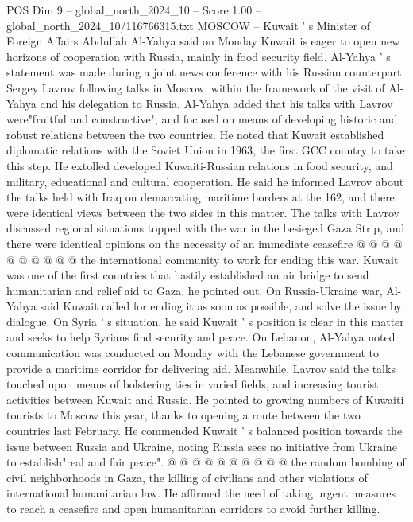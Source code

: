 \begin{textsample}{POS Dim 9 – global\_north\_2024\_10 – Score 1.00 – global\_north\_2024\_10/116766315.txt}  \label{ex:f9_pos_402}
MOSCOW -- Kuwait ' s Minister of Foreign Affairs Abdullah Al-Yahya said on Monday Kuwait is eager to open new horizons of cooperation with Russia, mainly in food security field.
Al-Yahya ' s statement was made during a joint news conference with his Russian counterpart Sergey Lavrov following talks in Moscow, within the framework of the visit of Al-Yahya and his delegation to Russia.
Al-Yahya added that his talks with Lavrov were"fruitful and constructive", and focused on means of developing historic and robust relations between the two countries.
He noted that Kuwait established diplomatic relations with the Soviet Union in 1963, the first GCC country to take this step.
He extolled developed Kuwaiti-Russian relations in food security, and military, educational and cultural cooperation.
He said he informed Lavrov about the talks held with Iraq on demarcating maritime borders at the 162, and there were identical views between the two sides in this matter.
The talks with Lavrov discussed regional situations topped with the war in the besieged Gaza Strip, and there were identical opinions on the necessity of an immediate ceasefire @ @ @ @ @ @ @ @ @ @ the international community to work for ending this war.
Kuwait was one of the first countries that hastily established an air bridge to send humanitarian and relief aid to Gaza, he pointed out.
On Russia-Ukraine war, Al-Yahya said Kuwait called for ending it as soon as possible, and solve the issue by dialogue.
On Syria ' s situation, he said Kuwait ' s position is clear in this matter and seeks to help Syrians find security and peace.
On Lebanon, Al-Yahya noted communication was conducted on Monday with the Lebanese government to provide a maritime corridor for delivering aid.
Meanwhile, Lavrov said the talks touched upon means of bolstering ties in varied fields, and increasing tourist activities between Kuwait and Russia.
He pointed to growing numbers of Kuwaiti tourists to Moscow this year, thanks to opening a route between the two countries last February.
He commended Kuwait ' s balanced position towards the issue between Russia and Ukraine, noting Russia sees no initiative from Ukraine to establish"real and fair peace". @ @ @ @ @ @ @ @ @ @ the random bombing of civil neighborhoods in Gaza, the killing of civilians and other violations of international humanitarian law.
He affirmed the need of taking urgent measures to reach a ceasefire and open humanitarian corridors to avoid further killing.

\end{textsample}
